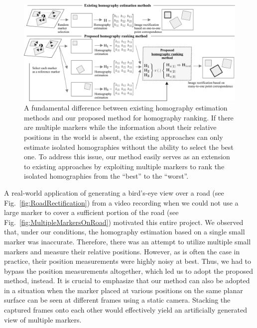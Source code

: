 \begin{figure}[t]
    \centerline{\includegraphics[width=\linewidth]{figures/homography/motivation_diagram.pdf}}
    \caption[Homography ranking motivation diagram]{A fundamental difference between existing homography estimation methods and our proposed method for homography ranking. If there are multiple markers while the information about their relative positions in the world is absent, the existing approaches can only estimate isolated homographies without the ability to select the best one. To address this issue, our method easily serves as an extension to existing approaches by exploiting multiple markers to rank the isolated homographies from the ``best'' to the ``worst''.}
    \label{fig:HomographyMotivationDiagram}
\end{figure}

A real-world application of generating a bird's-eye view over a road (see Fig.~\ref{fig:RoadRectification}) from a video recording when we could not use a large marker to cover a sufficient portion of the road (see Fig.~\ref{fig:MultipleMarkersOnRoad}) motivated this entire project. We observed that, under our conditions, the homography estimation based on a single small marker was inaccurate. Therefore, there was an attempt to utilize multiple small markers and measure their relative positions. However, as is often the case in practice, their position measurements were highly noisy at best. Thus, we had to bypass the position measurements altogether, which led us to adopt the proposed method, instead. It is crucial to emphasize that our method can also be adopted in a situation when the marker placed at various positions on the same planar surface can be seen at different frames using a static camera. Stacking the captured frames onto each other would effectively yield an artificially generated view of multiple markers.

